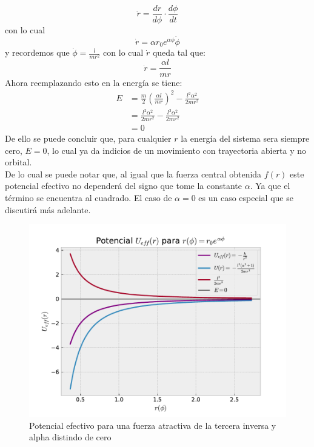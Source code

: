 \documentclass[../main.tex]{subfiles}
\begin{document}
\begin{equation*}
    \dot{r}=\frac{dr}{d\phi}\cdot \frac{d\phi}{dt}
\end{equation*}
con lo cual
\begin{equation*}
    \dot{r}=\alpha r_0 e^{\alpha \phi} \dot{\phi}
\end{equation*}
y recordemos que $\dot{\phi}=\frac{l}{mr^2}$ con lo cual $\dot{r}$ queda tal que:
\begin{equation}
    \dot{r}= \frac{\alpha l}{m r}
\end{equation}
Ahora reemplazando esto en la energía se tiene:
\begin{align*}
    E & = \frac{m}{2} \left( \frac{\alpha l}{m r} \right)^2-\frac{l^2\alpha^2}{2m r^2} \\
    & = \frac{l^2\alpha^2}{2mr^2}-\frac{l^2\alpha^2}{2m r^2} \\
    & = 0
\end{align*}
De ello se puede concluir que, para cualquier $r$ la energía del sistema sera siempre cero, $E=0$, lo cual ya da indicios de un movimiento con trayectoria abierta y no orbital. \\
De lo cual se puede notar que, al igual que la fuerza central obtenida $f(r)$ este potencial efectivo no dependerá del signo que tome la constante $\alpha$. Ya que el término se encuentra al cuadrado. El caso de $\alpha=0$ es un caso especial que se discutirá más adelante.
\begin{figure}[h]
    \centering
    \includegraphics[scale=0.7]{img/fuerzas-centrales/potencial1.pdf}
    \caption{Potencial efectivo para una fuerza atractiva de la tercera inversa y alpha distindo de cero}
    \label{fig:1}
\end{figure}
\end{document}
